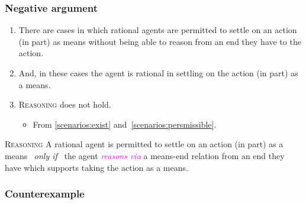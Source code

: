 \documentclass[noamssymb,
graphics,
]{beamer} %
\newcommand{\schemaName}[1]{\textsc{#1}}
\newcommand{\hozlinedash}[0]{
  \noindent\hdashrule[0.5ex][c]{\textwidth}{.1pt}{2.5pt}
}
\begin{document}
\begin{frame}
  \frametitle{Negative argument}

  {%
  \begin{enumerate}
  \item\label{scenarios:exist} There are cases in which rational agents are permitted to settle on an action (in part) as means without being able to reason from an end they have to the action.
  \item\label{scenarios:persmissible} And, in these cases the agent is rational in settling on the action (in part) as a means.
  \item \schemaName{Reasoning} does not hold.
    \begin{itemize}
    \item From \ref{scenarios:exist} and~\ref{scenarios:persmissible}.
    \end{itemize}
  \end{enumerate}
  }

  \hozlinedash
  {
    \begin{block}{\schemaName{Reasoning}}
      A rational agent is permitted to settle on an action (in part) as a means
      \newline
      \mbox{ }\hfill\emph{only if}\hfill\mbox{ }
      \newline
      the agent \textcolor{fuchsia}{\emph{reasons via}} a means-end relation from an end they have which supports taking the action as a means.
    \end{block}
  }
\end{frame}

\subsubsection{Counterexample}
\label{sec:counterexample}
\end{document}
